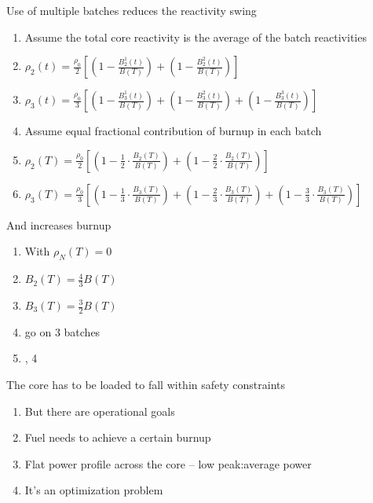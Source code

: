 \documentclass[aspectratio=1610,pdftex,dvipsnames,compress,xcolor={dvipsnames}]{beamer}
\newcommand{\acsp}{\acrshortpl} %
\begin{document}
\begin{frame}{Use of multiple batches reduces the reactivity swing}
    \begin{enumerate}[series=outerlist,topsep=0pt,itemsep=11pt,leftmargin=*,label=(\arabic*)]
        \item[]Assume the total core reactivity is the average of the batch reactivities
        \item[]$\rho_2(t)=\frac{\rho_0}{2}[(1-\frac{B_2^1(t)}{B(T)})+(1-\frac{B_2^2(t)}{B(T)})]$
        \item[]$\rho_3(t)=\frac{\rho_0}{3}[(1-\frac{B_3^1(t)}{B(T)})+(1-\frac{B_3^2(t)}{B(T)})+(1-\frac{B_3^3(t)}{B(T)})]$
        \item[]Assume equal fractional contribution of burnup in each batch
        \item[]$\rho_2(T)=\frac{\rho_0}{2}[(1-\frac{1}{2}\cdot\frac{B_2(T)}{B(T)})+(1-\frac{2}{2}\cdot\frac{B_2(T)}{B(T)})]$
        \item[]$\rho_3(T)=\frac{\rho_0}{3}[(1-\frac{1}{3}\cdot\frac{B_3(T)}{B(T)})+(1-\frac{2}{3}\cdot\frac{B_3(T)}{B(T)})+(1-\frac{3}{3}\cdot\frac{B_3(T)}{B(T)})]$
    \end{enumerate}
\end{frame}


\begin{frame}{And increases burnup}
    \begin{enumerate}[series=outerlist,topsep=0pt,itemsep=21pt,leftmargin=*,label=(\arabic*)]
        \item[]With $\rho_N(T)=0$
        \item[]$B_2(T)=\frac{4}{3}B(T)$
        \item[]$B_3(T)=\frac{3}{2}B(T)$
        \item[]\acsp{pwr} go on 3 batches
        \item[]\acsp{bwr}, 4
    \end{enumerate}
\end{frame}


\begin{frame}{The core has to be loaded to fall within safety constraints}
    \begin{enumerate}[series=outerlist,topsep=0pt,itemsep=21pt,leftmargin=*,label=(\arabic*)]
        \item[]But there are operational goals
        \item[]Fuel needs to achieve a certain burnup
        \item[]Flat power profile across the core -- low peak:average power
        \item[]It's an optimization problem
    \end{enumerate}
\end{frame}
\end{document}
